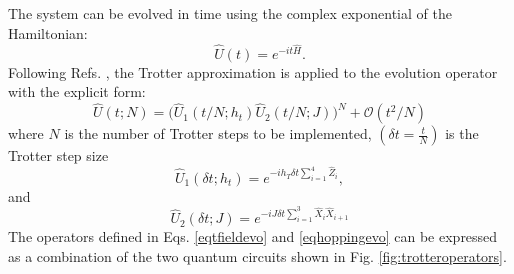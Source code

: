 The system can be evolved in time using the complex exponential of the Hamiltonian:
\begin{equation}
\label{eqtimeevolveexact}
\hat{U}(t) = e^{- i t \hat{H}}.
\end{equation}
Following Refs. \cite{Lloyd1073,GustafsonIsing},
the Trotter approximation %
is applied to the evolution operator 
with the explicit form:
\begin{equation}
\label{eqsuzuki}
\hat{U}(t;N) = \Big(\hat{U}_1(t / N; h_t) \hat{U}_2(t / N; J)\Big)^N + \mathcal{O}(t^2 / N)
\end{equation}
where $N$ is the number of Trotter steps to be implemented, $(\delta t=\frac{t}{N})$ is the Trotter step size
\begin{equation}
\label{eqtfieldevo}
\hat{U}_1(\delta t; h_t) = e^{-i h_T \delta t \sum_{i = 1}^{4} \hat{Z}_i },
\end{equation}
and
\begin{equation}
\label{eqhoppingevo}
\hat{U}_2(\delta t; J) = e^{-i J \delta t \sum_{i = 1}^{3} \hat{X}_i \hat{X}_{i+1}}
\end{equation}
The operators defined in Eqs. \ref{eqtfieldevo}  and \ref{eqhoppingevo} can be expressed as a combination of the two quantum circuits shown in Fig. \ref{fig:trotteroperators}.




